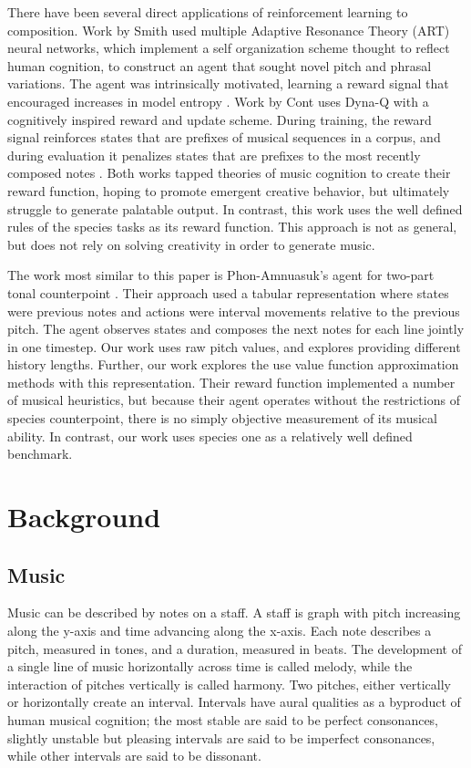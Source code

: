 \documentclass{article}
\begin{document}
    There have been several direct applications of reinforcement learning to composition. Work by Smith used multiple Adaptive Resonance Theory (ART) neural networks, which implement a self organization scheme thought to reflect human cognition, to construct an agent that sought novel pitch and phrasal variations. The agent was intrinsically motivated, learning a reward signal that encouraged increases in model entropy \cite{Smith2012}. Work by Cont uses Dyna-Q with a cognitively inspired reward and update scheme. During training, the reward signal reinforces states that are prefixes of musical sequences in a corpus, and during evaluation it penalizes states that are prefixes to the most recently composed notes \cite{Cont2007}. Both works tapped theories of music cognition to create their reward function, hoping to promote emergent creative behavior, but ultimately struggle to generate palatable output. In contrast, this work uses the well defined rules of the species tasks as its reward function. This approach is not as general, but does not rely on solving creativity in order to generate music.

	The work most similar to this paper is Phon-Amnuasuk's agent for two-part tonal counterpoint \cite{Phon-Amnuaisuk2009}. Their approach used a tabular representation where states were previous notes and actions were interval movements relative to the previous pitch. The agent observes states and composes the next notes for each line jointly in one timestep. Our work uses raw pitch values, and explores providing different history lengths. Further, our work explores the use value function approximation methods with this representation. Their reward function implemented a number of musical heuristics, but because their agent operates without the restrictions of species counterpoint, there is no simply objective measurement of its musical ability. In contrast, our work uses species one as a relatively well defined benchmark. 

    

	\section{Background}
    \subsection{Music}
    Music can be described by notes on a staff. A staff is graph with pitch increasing along the y-axis and time advancing along the x-axis. Each note describes a pitch, measured in tones, and a duration, measured in beats. The development of a single line of music horizontally across time is called melody, while the interaction of pitches vertically is called harmony. Two pitches, either vertically or horizontally create an interval. Intervals have aural qualities as a byproduct of human musical cognition; the most stable are said to be perfect consonances, slightly unstable but pleasing intervals are said to be imperfect consonances, while other intervals are said to be dissonant.
    
\end{document}
